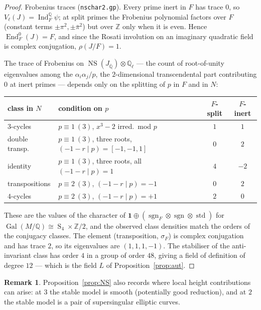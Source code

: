 \documentclass[11pt,reqno]{amsart}
\theoremstyle{plain}
\theoremstyle{definition}
\newtheorem{remark}[theorem]{Remark}
\newcommand{\Q}{\mathbb{Q}}
\newcommand{\Z}{\mathbb{Z}}
\newcommand{\Qbar}{\overline{\Q}}
\DeclareMathOperator{\NS}{NS}
\DeclareMathOperator{\End}{End}
\DeclareMathOperator{\Gal}{Gal}
\DeclareMathOperator{\Ind}{Ind}
\DeclareMathOperator{\sgn}{sgn}
\DeclareMathOperator{\stdrep}{std}
\DeclareMathOperator{\Sym}{S}
\numberwithin{equation}{section}
\begin{document}
\begin{proof}
Frobenius traces (\texttt{nschar2.gp}). Every prime inert in $F$ has trace $0$,
so $V_{\ell}(J)=\Ind_{F}^{\Q}\psi$; at split primes the Frobenius polynomial
factors over $F$ (constant terms $\pm\pi^{2},\pm\bar\pi^{2}$) but over $\Z$ only
when it is even. Hence $\End^{0}_{F}(J)=F$, and since the Rosati involution on
an imaginary quadratic field is complex conjugation, $\rho(J/F)=1$.

The trace of Frobenius on $\NS(J_{\Qbar})\otimes\Q_{\ell}$ --- the count of
root-of-unity eigenvalues among the $\alpha_{i}\alpha_{j}/p$, the $2$-dimensional
transcendental part contributing $0$ at inert primes --- depends only on the
splitting of $p$ in $F$ and in $N$:
\begin{center}\small
\begin{tabular}{@{}llcc@{}}
\toprule
class in $N$ & condition on $p$ & $F$-split & $F$-inert\\
\midrule
$3$-cycles        & $p\equiv1\ (3)$, $x^{3}-2$ irred.\ mod $p$              & $1$ & $1$\\
double transp.    & $p\equiv1\ (3)$, three roots, $(-1-r\mid p)=[-1,-1,1]$  & $0$ & $2$\\
identity          & $p\equiv1\ (3)$, three roots, all $(-1-r\mid p)=1$      & $4$ & $-2$\\
transpositions    & $p\equiv2\ (3)$, $(-1-r\mid p)=-1$                      & $0$ & $2$\\
$4$-cycles        & $p\equiv2\ (3)$, $(-1-r\mid p)=+1$                      & $2$ & $0$\\
\bottomrule
\end{tabular}
\end{center}
These are the values of the character of
$\mathbf{1}\oplus(\sgn_{F}\otimes\sgn\otimes\stdrep)$ for
$\Gal(M/\Q)\cong\Sym_{4}\times\Z/2$, and the observed class densities match the
orders of the conjugacy classes. The element (transposition, $\sigma_{F}$) is
complex conjugation and has trace $2$, so its eigenvalues are $(1,1,1,-1)$. The
stabiliser of the anti-invariant class has order $4$ in a group of order $48$,
giving a field of definition of degree $12$ --- which is the field $L$ of
Proposition~\ref{prop:aut}.
\end{proof}

\begin{remark}
Proposition~\ref{prop:NS} also records where local height contributions can
arise: at $3$ the stable model is smooth (potentially good reduction), and at
$2$ the stable model is a pair of supersingular elliptic curves.
\end{remark}
\end{document}
